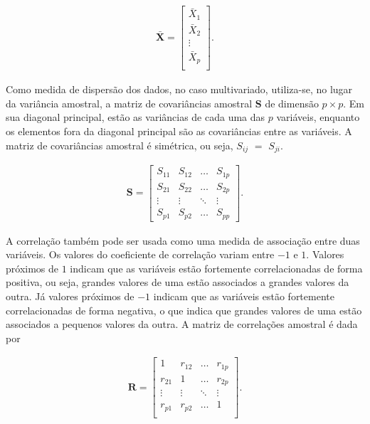 \documentclass[12pt,a4paper]{article}
\begin{document}
\begin{align*}
	\boldsymbol{\bar{X}} = \left[
	\begin{array}{c}
    	\bar{X}_1\\
	    \bar{X}_2\\
	    \vdots\\
	    \bar{X}_p\\
    \end{array}
	\right].
\end{align*}
	
Como medida de dispersão dos dados, no caso multivariado, utiliza-se, no lugar da variância amostral, a matriz de covariâncias amostral $\boldsymbol{S}$ de dimensão $p \times p$. Em sua diagonal principal, estão as variâncias de cada uma das $p$ variáveis, enquanto os elementos fora da diagonal principal são as covariâncias entre as variáveis. A matriz de covariâncias amostral é simétrica, ou seja,  $S_{ij}$ $=$ $S_{ji}$.
	
	
\begin{align*}
	\boldsymbol{S} =
	\left[
	\begin{array}{cccc}
    	S_{11} & S_{12} & \dots & S_{1p} \\
	    S_{21} & S_{22} & \dots & S_{2p} \\
	    \vdots & \vdots & \ddots & \vdots \\
	    S_{p1} & S_{p2} & \dots & S_{pp} 
	\end{array}
	\right].
\end{align*}        
	
A correlação também pode ser usada como uma medida de associação entre duas variáveis. Os valores do coeficiente de correlação variam entre $-1$ e $1$. Valores próximos de $1$ indicam que as variáveis estão fortemente correlacionadas de forma positiva, ou seja, grandes valores de uma estão associados a grandes valores da outra. Já valores próximos de $-1$ indicam que as variáveis estão fortemente correlacionadas de forma negativa, o que indica que grandes valores de uma estão associados a pequenos valores da outra. A matriz de correlações amostral é dada por 
	
\begin{align}
	\boldsymbol{R} =
	\left[
	\begin{array}{cccc}
    	1      & r_{12} & \dots  & r_{1p} \\
	    r_{21} & 1 & \dots  & r_{2p} \\
	    \vdots & \vdots & \ddots & \vdots \\
	    r_{p1} & r_{p2} & \dots  & 1\\
	\end{array}
	\right].
	\label{def_matriz_corr_2}
\end{align}        
	
\end{document}
